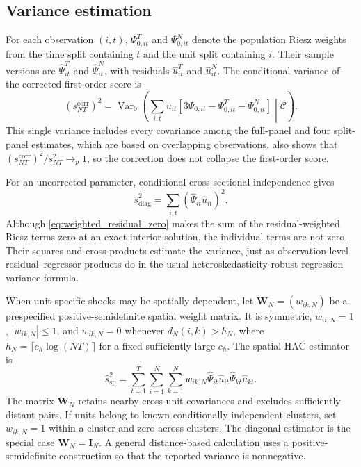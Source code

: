 \documentclass[11pt]{article}
\numberwithin{equation}{section}
\theoremstyle{remark}
\begin{document}
\subsection{Variance estimation}
\label{subsec:variance}

For each observation $(i,t)$, $\Psi_{0,it}^{T}$ and $\Psi_{0,it}^{N}$ denote the population Riesz weights from the time split containing $t$ and the unit split containing $i$. Their sample versions are $\widehat\Psi_{it}^{T}$ and $\widehat\Psi_{it}^{N}$, with residuals $\widehat u_{it}^{T}$ and $\widehat u_{it}^{N}$. The conditional variance of the corrected first-order score is
\begin{equation}
\label{eq:corrected_population_variance}
(s_{NT}^{\mathrm{corr}})^2
=
\operatorname{Var}_0\!\left(
\sum_{i,t}u_{it}
\left[
3\Psi_{0,it}
-\Psi_{0,it}^{T}
-\Psi_{0,it}^{N}
\right]
\middle|\mathscr C
\right).
\end{equation}
This single variance includes every covariance among the full-panel and four split-panel estimates, which are based on overlapping observations.  also shows that $(s_{NT}^{\mathrm{corr}})^2/s_{NT}^2\to_p1$, so the correction does not collapse the first-order score.

For an uncorrected parameter, conditional cross-sectional independence gives
$$
\widehat s_{\mathrm{diag}}^2
=
\sum_{i,t}
(\widehat\Psi_{it}\widehat u_{it})^2.
$$
Although \eqref{eq:weighted_residual_zero} makes the sum of the residual-weighted Riesz terms zero at an exact interior solution, the individual terms are not zero. Their squares and cross-products estimate the variance, just as observation-level residual--regressor products do in the usual heteroskedasticity-robust regression variance formula.

When unit-specific shocks may be spatially dependent, let $\bm W_N=(w_{ik,N})$ be a prespecified positive-semidefinite spatial weight matrix. It is symmetric, $w_{ii,N}=1$, $|w_{ik,N}|\le1$, and $w_{ik,N}=0$ whenever $d_N(i,k)>h_N$, where $h_N=\lceil c_h\log(NT)\rceil$ for a fixed sufficiently large $c_h$. The spatial HAC estimator is
\begin{equation}
\label{eq:spatial_variance}
\widehat s_{\mathrm{sp}}^2
=
\sum_{t=1}^{T}\sum_{i=1}^{N}\sum_{k=1}^{N}
w_{ik,N}
\widehat\Psi_{it}\widehat u_{it}
\widehat\Psi_{kt}\widehat u_{kt}.
\end{equation}
The matrix $\bm W_N$ retains nearby cross-unit covariances and excludes sufficiently distant pairs. If units belong to known conditionally independent clusters, set $w_{ik,N}=1$ within a cluster and zero across clusters. The diagonal estimator is the special case $\bm W_N=\bm I_N$. A general distance-based calculation uses a positive-semidefinite construction so that the reported variance is nonnegative.
\end{document}

